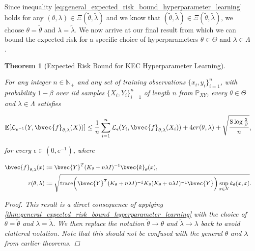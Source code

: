 \documentclass{article}
\newtheorem{theorem}{Theorem}[section]
\begin{document}
		Since inequality \eqref{eq:general_expected_risk_bound_hyperparameter_learning} holds for any $(\theta, \lambda) \in \Xi(\tilde{\theta}, \tilde{\lambda})$ and we know that $(\tilde{\theta}, \tilde{\lambda}) \in \Xi(\tilde{\theta}, \tilde{\lambda})$, we choose $\theta = \tilde{\theta}$ and $\lambda = \tilde{\lambda}$.  We now arrive at our final result from which we can bound the expected risk for a specific choice of hyperparameters $\theta \in \Theta$ and $\lambda \in \Lambda$.
		
		\begin{theorem}[Expected Risk Bound for KEC Hyperparameter Learning]
			\label{thm:expected_risk_bound_hyperparameter_learning}
			
			For any integer $n \in \mathbb{N}_{+}$ and any set of training observations $\{x_{i}, y_{i}\}_{i = 1}^{n}$, with probability $1 - \beta$ over \textit{iid} samples $\{X_{i}, Y_{i}\}_{i = 1}^{n}$ of length $n$ from $\mathbb{P}_{X Y}$, every $\theta \in \Theta$ and $\lambda \in \Lambda$ satisfies
			
			\begin{equation}
				\mathbb{E}[\mathcal{L}_{e^{-1}}(Y, \bvec{f}_{\theta, \lambda}(X))] \leq \frac{1}{n} \sum_{i = 1}^{n} \mathcal{L}_{\epsilon}(Y_{i}, \bvec{f}_{\theta, \lambda}(X_{i})) + 4 e r(\theta, \lambda) + \sqrt{\frac{8 \log{\frac{2}{\beta}}}{n}},
			\label{eq:expected_risk_bound_hyperparameter_learning}
			\end{equation}
			
			for every $\epsilon \in (0, e^{-1})$, where 
			
			\begin{equation}
				\begin{aligned}
					\bvec{f}_{\theta, \lambda}(x) &:= \bvec{Y}^{T} (K_{\theta} + n \lambda I)^{-1} \bvec{k}_{\theta}(x), \\
					r(\theta, \lambda) &:= \sqrt{\mathrm{trace}\bigg(\bvec{Y}^{T} (K_{\theta} + n \lambda I)^{-1} K_{\theta} (K_{\theta} + n \lambda I)^{-1} \bvec{Y}\bigg) \sup_{x \in \mathcal{X}} k_{\theta}(x, x)}.
				\end{aligned}
			\end{equation}
			
			\begin{proof}
				This result is a direct consequence of applying \cref{thm:general_expected_risk_bound_hyperparameter_learning} with the choice of $\theta = \tilde{\theta}$ and $\lambda = \tilde{\lambda}$. We then replace the notation $\tilde{\theta} \rightarrow \theta$ and $\tilde{\lambda} \rightarrow \lambda$ back to avoid cluttered notation. Note that this should not be confused with the general $\theta$ and $\lambda$ from earlier theorems.
			\end{proof}
		\end{theorem}
		
\end{document}
